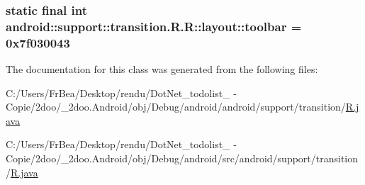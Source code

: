 \hypertarget{classandroid_1_1support_1_1transition_1_1_r_1_1layout_0836ba6a09ee14acf89c5ca05fd94533}{
\subsubsection[{toolbar}]{\setlength{\rightskip}{0pt plus 5cm}static final int android::support::transition.R.R::layout::toolbar = 0x7f030043}}
\label{classandroid_1_1support_1_1transition_1_1_r_1_1layout_0836ba6a09ee14acf89c5ca05fd94533}




The documentation for this class was generated from the following files:\begin{CompactItemize}
\item 
C:/Users/FrBea/Desktop/rendu/DotNet\_\-todolist\_ - Copie/2doo/\_\-2doo.Android/obj/Debug/android/android/support/transition/\hyperlink{android_2support_2transition_2_r_8java}{R.java}\item 
C:/Users/FrBea/Desktop/rendu/DotNet\_\-todolist\_ - Copie/2doo/\_\-2doo.Android/obj/Debug/android/src/android/support/transition/\hyperlink{src_2android_2support_2transition_2_r_8java}{R.java}\end{CompactItemize}
